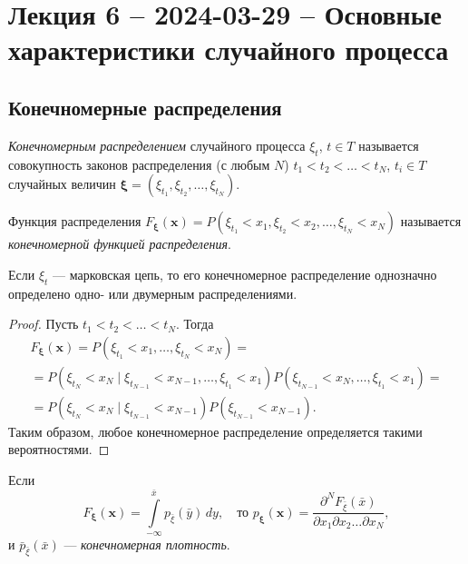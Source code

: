 \section{Лекция 6 -- 2024-03-29 -- Основные характеристики случайного процесса}
\subsection{Конечномерные распределения}
\begin{definition}
  \emph{Конечномерным распределением} случайного процесса $\xi_t$, $t\in T$ 
  называется совокупность законов распределения
  (с любым $ N $) $t_1 < t_2 < \dots < t_N$, $t_i \in T$
  случайных величин $\bm{\xi} = (\xi_{t_1}, \xi_{t_2}, \dots, \xi_{t_N})$.

  Функция распределения
  $F_{\bm{\xi}} (\mathbf{x}) = P(\xi_{t_1} < x_1, \xi_{t_2} < x_2, \dots, \xi_{t_N} < x_N)$
  называется \emph{конечномерной функцией распределения}.
\end{definition}


\begin{theorem}
  Если $\xi_t$ --- марковская цепь, то его конечномерное распределение однозначно 
  определено одно- или двумерным распределениями.
\end{theorem}
\begin{proof}
  Пусть $t_1 < t_2 < \dots < t_N$. Тогда
  \begin{multline*}
    F_{\bm{\xi}} (\mathbf{x}) = P(\xi_{t_1} < x_1, \dots, \xi_{t_N} < x_N) = \\
    = P(\xi_{t_N} < x_N \mid \xi_{t_{N-1}} < x_{N-1}, \dots, \xi_{t_1} < x_1)
      P(\xi_{t_{N-1}} < x_{N}, \dots, \xi_{t_1} < x_1) = \\
    = P(\xi_{t_N} < x_N \mid \xi_{t_{N-1}} < x_{N-1}) P(\xi_{t_{N-1}} < x_{N-1}).
  \end{multline*}
  Таким образом, любое конечномерное распределение определяется такими вероятностями.
\end{proof}

\begin{definition}
  Если
  \[
    F_{\bm{\xi}}(\mathbf{x}) = \int\limits_{-\infty}^{\bar{x}} p_{\bar{\xi}}
    (\bar{y}) \, dy,\quad \text{то }     p_{\bm{\xi}} (\mathbf{x}) = \dfrac{\partial^N F_{\bar{\xi}}
    (\bar{x})}{\partial x_1 \partial x_2 \dots \partial x_N},
  \]
  и $\bar{p}_\bar{\xi} (\bar{x})$ --- \emph{конечномерная плотность}.
\end{definition}

